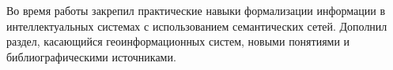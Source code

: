 Во время работы закрепил практические навыки формализации информации в интеллектуальных системах с использованием семантических сетей. Дополнил раздел, касающийся геоинформационных систем, новыми понятиями и библиографическими источниками. 

